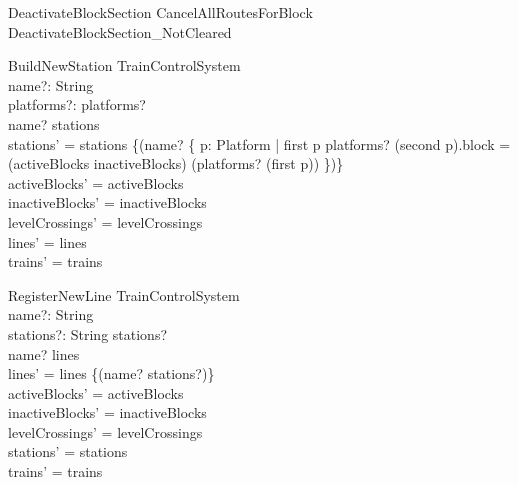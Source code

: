 \begin{zed}
DeactivateBlockSection  CancelAllRoutesForBlock \semi  DeactivateBlockSection\_NotCleared
\end{zed}

\begin{schema}{BuildNewStation}
  \Delta TrainControlSystem\\
  name?: String\\
  platforms?: \iseq  \nat 
\where
  platforms? \neq  \langle \rangle \\
  name? \notin  \dom  stations\\
  stations' = stations \oplus  \{(name? \mapsto  \{  p: \nat  \cross  Platform | first p \in  \dom  platforms? \land  (second p).block = (activeBlocks \cup  inactiveBlocks) (platforms? (first p)) \})\}\\
  activeBlocks' = activeBlocks\\
  inactiveBlocks' = inactiveBlocks\\
  levelCrossings' = levelCrossings\\
  lines' = lines\\
  trains' = trains
\end{schema}

\begin{schema}{RegisterNewLine}
  \Delta TrainControlSystem\\
  name?: String\\
  stations?: \iseq  String
\where
  stations? \neq  \langle \rangle \\
  name? \notin  \dom  lines\\
  lines' = lines \oplus  \{(name? \mapsto  stations?)\}\\
  activeBlocks' = activeBlocks\\
  inactiveBlocks' = inactiveBlocks\\
  levelCrossings' = levelCrossings\\
  stations' = stations\\
  trains' = trains
\end{schema}

